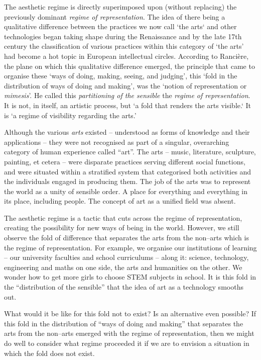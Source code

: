 \documentclass[letterpaper]{article}
\begin{document}
    The aesthetic regime is directly superimposed upon (without replacing) the previously dominant \emph{regime of representation}. The idea of there being a qualitative difference between the practices we now call ‘the arts‘ and other technologies began taking shape during the Renaissance \citep[p.136]{TatarkiewiczWhtIsArt1971} and by the late 17th century the classification of various practices within this category of ‘the arts’ had become a hot topic in European intellectual circles. According to Rancière, the plane on which this qualitative difference emerged, the principle that came to organise these ‘ways of doing, making, seeing, and judging’, this ‘fold in the distribution of ways of doing and making’, was the ‘notion of representation or \emph{mimesis}’. He called this \emph{partitioning of the sensible} the \emph{regime of representation}. It is not, in itself, an artistic process, but ‘a fold that renders the arts visible.‘ It is  ‘a regime of visibility regarding the arts.’ \citep[p.22]{RancierPltcsOfThAsthtcs2004}
    
    Although the various \emph{arts} existed – understood as forms of knowledge and their applications – they were not recognised as part of a singular, overarching category of human experience called “art”. The arts – music, literature, sculpture, painting, et cetera – were disparate practices serving different social functions, and were situated within a stratified system that categorised both activities and the individuals engaged in producing them. The job of the arts was to represent the world as a unity of sensible order. A place for everything and everything in its place, including people. The concept of art as a unified field was absent.
    
    The aesthetic regime is a tactic that cuts across the regime of representation, creating the possibility for new ways of being in the world. However, we still observe the fold of difference that separates the arts from the non–arts which is the regime of representation. For example, we organise our institutions of learning – our university faculties and school curriculums – along it: science, technology, engineering and maths on one side, the arts and humanities on the other. We wonder how to get more girls to choose STEM subjects in school. It is this fold in the “distribution of the sensible” \citep[p.42]{RancierPltcsOfThAsthtcs2004} that the idea of art as a technology smooths out.
    
    What would it be like for this fold not to exist? Is an alternative even possible? If this fold in the distribution of “ways of doing and making” \citep[p.13]{RancierPltcsOfThAsthtcs2004} that separates the arts from the non–arts emerged with the regime of representation, then we might do well to consider what regime proceeded it if we are to envision a situation in which the fold does not exist.
    
\end{document}
